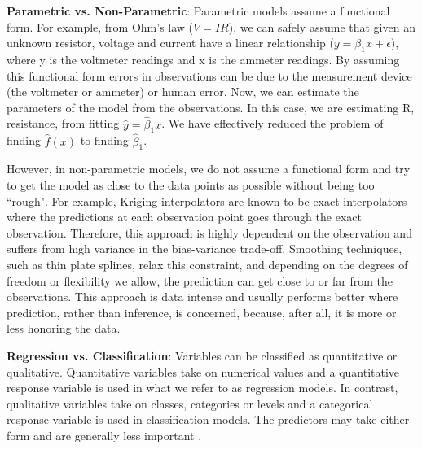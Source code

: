 \textbf{Parametric vs. Non-Parametric}: Parametric models assume a functional form. For example, from Ohm's law ($V=IR$), we can safely assume that given an unknown resistor, voltage and current have a linear relationship ($y=\beta_1x+\epsilon$), where y is the voltmeter readings and x is the ammeter readings. By assuming this functional form errors in observations can be due to the measurement device (the voltmeter or ammeter) or human error. Now, we can estimate the parameters of the model from the observations. In this case, we are estimating R, resistance, from fitting $\hat{y}=\hat{\beta}_1x$. We have effectively reduced the problem of finding $\hat{f}(x)$ to finding $\hat{\beta}_1$. 

However, in non-parametric models, we do not assume a functional form and try to get the model as close to the data points as possible without being too ``rough". For example, Kriging interpolators are known to be exact interpolators where the predictions at each observation point goes through the exact observation. Therefore, this approach is highly dependent on the observation and suffers from high variance in the bias-variance trade-off. Smoothing techniques, such as thin plate splines, relax this constraint, and depending on the degrees of freedom or flexibility we allow, the prediction can get close to or far from the observations. This approach is data intense and usually performs better where prediction, rather than inference, is concerned, because, after all, it is more or less honoring the data.

\textbf{Regression vs. Classification}: Variables can be classified as quantitative or qualitative. Quantitative variables take on numerical values and a quantitative response variable is used in what we refer to as regression models. In contrast, qualitative variables take on classes, categories or levels and a categorical response variable is used in classification models. The predictors may take either form and are generally less important \cite{james2013introduction}. 

